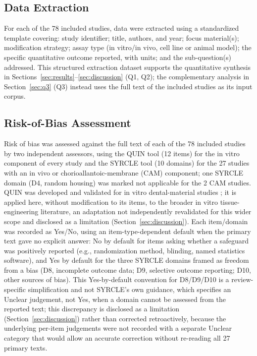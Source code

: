 \documentclass[5p,times,twocolumn]{elsarticle}
\begin{document}
\subsection{Data Extraction}

For each of the 78 included studies, data were extracted using a standardized template covering: study identifier; title, authors, and year; focus material(s); modification strategy; assay type (in vitro/in vivo, cell line or animal model); the specific quantitative outcome reported, with units; and the sub-question(s) addressed. This structured extraction dataset supports the quantitative synthesis in Sections~\ref{sec:results}--\ref{sec:discussion} (Q1, Q2); the complementary analysis in Section~\ref{sec:q3} (Q3) instead uses the full text of the included studies as its input corpus.

\subsection{Risk-of-Bias Assessment}
\label{sec:rob}

Risk of bias was assessed against the full text of each of the 78 included studies by two independent assessors, using the QUIN tool \cite{ref84} (12 items) for the in vitro component of every study and the SYRCLE tool \cite{ref85} (10 domains) for the 27 studies with an in vivo or chorioallantoic-membrane (CAM) component; one SYRCLE domain (D4, random housing) was marked not applicable for the 2 CAM studies. QUIN was developed and validated for in vitro dental-material studies \cite{ref84}; it is applied here, without modification to its items, to the broader in vitro tissue-engineering literature, an adaptation not independently revalidated for this wider scope and disclosed as a limitation (Section~\ref{sec:discussion}). Each item/domain was recorded as Yes/No, using an item-type-dependent default when the primary text gave no explicit answer: No by default for items asking whether a safeguard was positively reported (e.g., randomization method, blinding, named statistics software), and Yes by default for the three SYRCLE domains framed as freedom from a bias (D8, incomplete outcome data; D9, selective outcome reporting; D10, other sources of bias). This Yes-by-default convention for D8/D9/D10 is a review-specific simplification and not SYRCLE's own guidance, which specifies an Unclear judgement, not Yes, when a domain cannot be assessed from the reported text; this discrepancy is disclosed as a limitation (Section~\ref{sec:discussion}) rather than corrected retroactively, because the underlying per-item judgements were not recorded with a separate Unclear category that would allow an accurate correction without re-reading all 27 primary texts.
\end{document}
